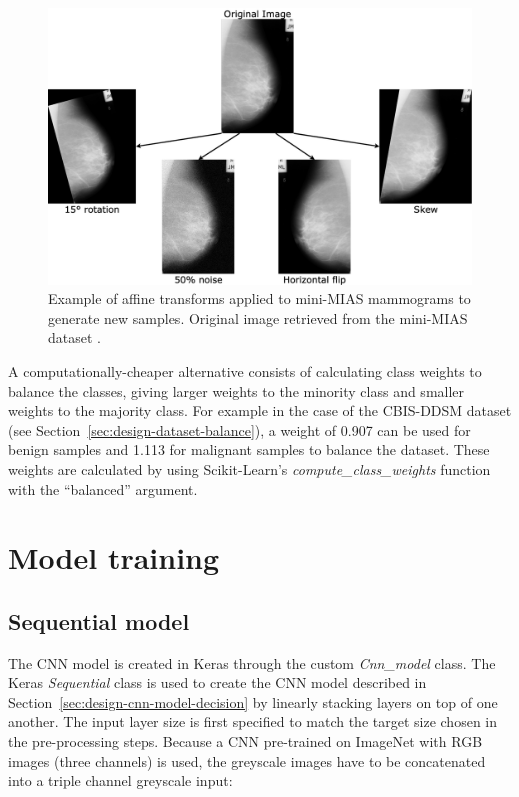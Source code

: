 \begin{figure}[h]
\centerline{\includegraphics[width=\textwidth]{figures/implementation/Data augmentation transforms.png}}
\caption{\label{fig:implementation-Data augmentation transforms}Example of affine transforms applied to mini-MIAS mammograms to generate new samples. Original image retrieved from the mini-MIAS dataset \citep{Suckling1994}.}
\end{figure}

A computationally-cheaper alternative consists of calculating class weights to balance the classes, giving larger weights to the minority class and smaller weights to the majority class. For example in the  case of the CBIS-DDSM dataset (see Section~\ref{sec:design-dataset-balance}), a weight of 0.907 can be used for benign samples and 1.113 for malignant samples to balance the dataset. These weights are calculated by using Scikit-Learn's \textit{compute\_class\_weights} function with the ``balanced'' argument.


\section{Model training}

\subsection{Sequential model}
\label{sec:implementation-sequential-cnn-model}

The CNN model is created in Keras through the custom \textit{Cnn\_model} class. The Keras \textit{Sequential} class is used to create the CNN model described in Section~\ref{sec:design-cnn-model-decision} by linearly stacking layers on top of one another. The input layer size is first specified to match the target size chosen in the pre-processing steps. Because a CNN pre-trained on ImageNet with RGB images (three channels) is used, the greyscale images have to be concatenated into a triple channel greyscale input:

